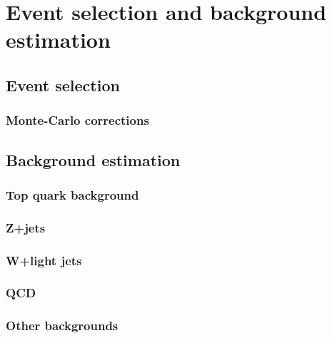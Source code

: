 
\chapter{Event selection and background estimation} %

\label{Chapter6} %





\section{Event selection}



\subsection{Monte-Carlo corrections}





\section{Background estimation}



\subsection{Top quark background}



\subsection{Z+jets}

\subsection{W+light jets}

\subsection{QCD}

\subsection{Other backgrounds}

